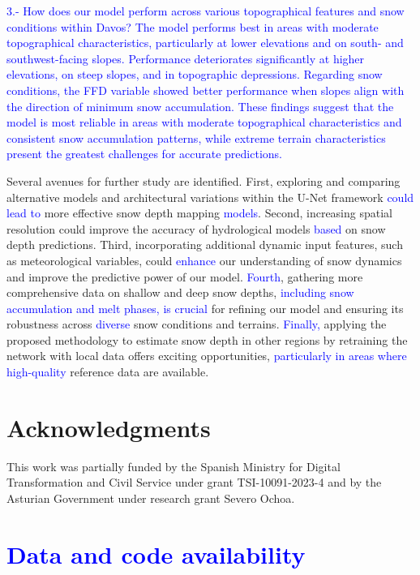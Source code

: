 \documentclass[preprint,12pt]{elsarticle}
\begin{document}
\textcolor{blue}{
3.- How does our model perform across various topographical features and snow conditions within Davos?
The model performs best in areas with moderate topographical characteristics, particularly at lower elevations and on south- and southwest-facing slopes. Performance deteriorates significantly at higher elevations, on steep slopes, and in topographic depressions. Regarding snow conditions, the FFD variable showed better performance when slopes align with the direction of minimum snow accumulation. These findings suggest that the model is most reliable in areas with moderate topographical characteristics and consistent snow accumulation patterns, while extreme terrain characteristics present the greatest challenges for accurate predictions.}

Several avenues for further study are identified. First, exploring and comparing alternative models and architectural variations within the U-Net framework \textcolor{blue}{could lead to} more effective snow depth mapping \textcolor{blue}{models}. Second, increasing spatial resolution could improve the accuracy of hydrological models \textcolor{blue}{based} on snow depth predictions. Third, incorporating additional dynamic input features, such as meteorological variables, could \textcolor{blue}{enhance} our understanding of snow dynamics and improve the predictive power of our model. \textcolor{blue}{Fourth}, gathering more comprehensive data on shallow and deep snow depths, \textcolor{blue}{including snow accumulation and melt phases, is crucial} for refining our model and ensuring its robustness across \textcolor{blue}{diverse} snow conditions and terrains. \textcolor{blue}{Finally,} applying the proposed methodology to estimate snow depth in other regions by retraining the network with local data offers exciting opportunities, \textcolor{blue}{particularly in areas where high-quality} reference data are available.

\section*{Acknowledgments}

This work was partially funded by the Spanish Ministry for Digital Transformation and Civil Service under grant TSI-10091-2023-4 and by the Asturian Government under research grant Severo Ochoa.

\section*{\textcolor{blue}{Data and code availability}}
\end{document}
